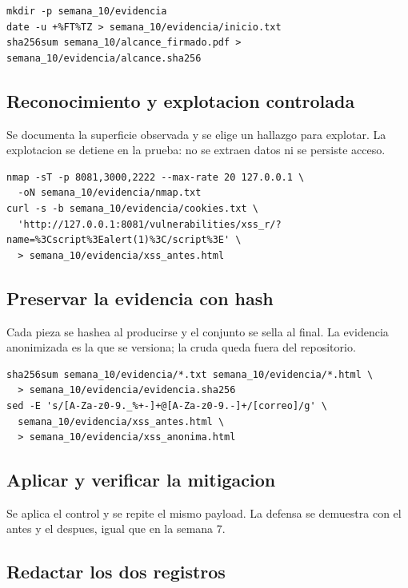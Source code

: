\documentclass[11pt,a4paper]{article}
\begin{document}
\begin{lstlisting}[style=estiloCodigo]
mkdir -p semana_10/evidencia
date -u +%FT%TZ > semana_10/evidencia/inicio.txt
sha256sum semana_10/alcance_firmado.pdf > semana_10/evidencia/alcance.sha256
\end{lstlisting}

\subsection{Reconocimiento y explotacion controlada}

Se documenta la superficie observada y se elige un hallazgo para explotar. La explotacion se detiene en la prueba: no se extraen datos ni se persiste acceso.

\begin{lstlisting}[style=estiloCodigo]
nmap -sT -p 8081,3000,2222 --max-rate 20 127.0.0.1 \
  -oN semana_10/evidencia/nmap.txt
curl -s -b semana_10/evidencia/cookies.txt \
  'http://127.0.0.1:8081/vulnerabilities/xss_r/?name=%3Cscript%3Ealert(1)%3C/script%3E' \
  > semana_10/evidencia/xss_antes.html
\end{lstlisting}

\subsection{Preservar la evidencia con hash}

Cada pieza se hashea al producirse y el conjunto se sella al final. La evidencia anonimizada es la que se versiona; la cruda queda fuera del repositorio.

\begin{lstlisting}[style=estiloCodigo]
sha256sum semana_10/evidencia/*.txt semana_10/evidencia/*.html \
  > semana_10/evidencia/evidencia.sha256
sed -E 's/[A-Za-z0-9._%+-]+@[A-Za-z0-9.-]+/[correo]/g' \
  semana_10/evidencia/xss_antes.html \
  > semana_10/evidencia/xss_anonima.html
\end{lstlisting}

\subsection{Aplicar y verificar la mitigacion}

Se aplica el control y se repite el mismo payload. La defensa se demuestra con el antes y el despues, igual que en la semana 7.

\subsection{Redactar los dos registros}
\end{document}
